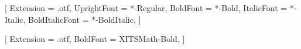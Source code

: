 
\ifsetCustomMargin
  \RequirePackage[left=37mm,right=30mm,top=35mm,bottom=30mm]{geometry}
  \setFancyHdr %
\fi

\raggedbottom



\ifsetCustomFont

\usepackage{polyglossia}
\usepackage[autostyle=true]{csquotes}

\setmainlanguage[variant=mono]{greek}

\usepackage{amsmath}
\usepackage[]{unicode-math}
\setmainfont{XITS}
[    Extension = .otf,
   UprightFont = *-Regular,
      BoldFont = *-Bold,
    ItalicFont = *-Italic,
BoldItalicFont = *-BoldItalic,
]

[    Extension = .otf,
     BoldFont = XITSMath-Bold,
]

\newfontfamily{}
\newfontfamily{}
\newfontfamily{}


\fi

